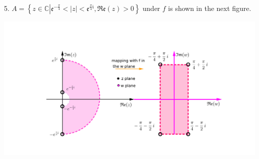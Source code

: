 \documentclass[11pt]{amsart}
\newcommand{\dsp}{\displaystyle}
\newcommand{\BBC}{\mathbb{C}}\newcommand{\mi}{\mathfrak{i}}
\begin{document}
5. $\dsp A=\left\{z\in\BBC\left|\mathfrak{e}^{-\frac{\pi}{4}}<|z|<\mathfrak{e}^{\frac{\pi}{4}\mi},\mathfrak{Re}(z)>0\right.\right\}$ 
under $f$ is shown in the next figure.
\begin{center}\includegraphics{2e.png}\end{center}
\end{document}
